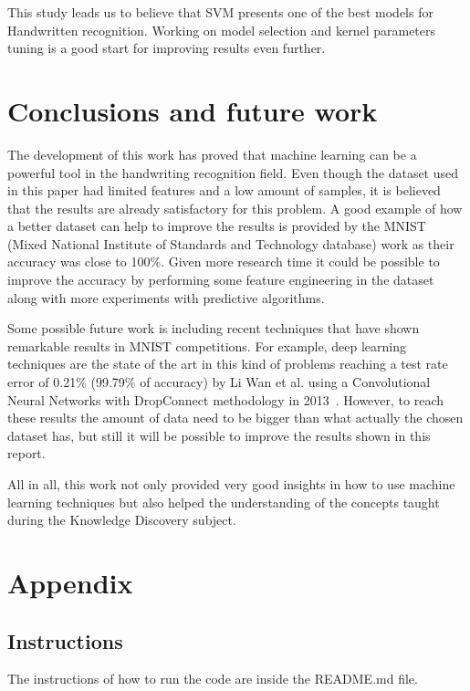 \documentclass[letterpaper,10pt]{article}
\theoremstyle{mytheor}
\begin{document}
This study leads us to believe that SVM presents one of the best models for Handwritten recognition. Working on model selection and kernel parameters tuning is a good start for improving results even further.

\section{Conclusions and future work}

The development of this work has proved that machine learning can be a powerful tool in the handwriting recognition field. Even though the dataset used in this paper had limited features and a low amount of samples, it is believed that the results are already satisfactory for this problem. A good example of how a better dataset can help to improve the results is provided by the MNIST (Mixed National Institute of Standards and Technology database) work as their accuracy was close to 100\%. Given more research time it could be possible to improve the accuracy by performing some feature engineering in the dataset along with more experiments with predictive algorithms. 

Some possible future work is including recent techniques that have shown remarkable results in MNIST competitions. For example, deep learning techniques are the state of the art in this kind of problems reaching a test rate error of 0.21\% (99.79\% of accuracy) by Li Wan et al. using a Convolutional Neural Networks with DropConnect methodology in 2013~\cite{wan2013regularization}. However, to reach these results the amount of data need to be bigger than what actually the chosen dataset has, but still it will be possible to improve the results shown in this report.

All in all, this work not only provided very good insights in how to use machine learning techniques but also helped the understanding of the concepts taught during the Knowledge Discovery subject.





\section{Appendix}

\subsection{Instructions}
The instructions of how to run the code are inside the README.md file.
\end{document}
